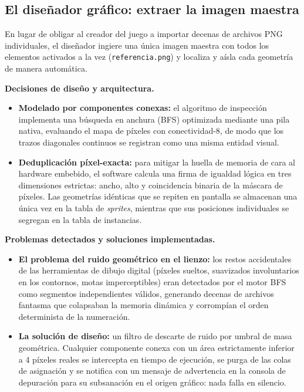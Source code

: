 \subsection{El diseñador gráfico: extraer la imagen maestra}
\label{sec:F1Extraccion}

En lugar de obligar al creador del juego a importar decenas de
archivos PNG individuales, el diseñador ingiere una única imagen
maestra con todos los elementos activados a la vez
(\texttt{referencia.png}) y localiza y aísla cada geometría de manera
automática.

\textbf{Decisiones de diseño y arquitectura.}

\begin{itemize}
	\item \textbf{Modelado por componentes conexas:} el algoritmo de
	inspección implementa una búsqueda en anchura (BFS) optimizada
	mediante una pila nativa, evaluando el mapa de píxeles con
	conectividad-8, de modo que los trazos diagonales continuos se
	registran como una misma entidad visual.
	\item \textbf{Deduplicación píxel-exacta:} para mitigar la huella de
	memoria de cara al hardware embebido, el software calcula una firma
	de igualdad lógica en tres dimensiones estrictas: ancho, alto y
	coincidencia binaria de la máscara de píxeles. Las geometrías
	idénticas que se repiten en pantalla se almacenan una única vez en la
	tabla de \emph{sprites}, mientras que sus posiciones individuales se
	segregan en la tabla de instancias.
\end{itemize}

\textbf{Problemas detectados y soluciones implementadas.}

\begin{itemize}
	\item \textbf{El problema del ruido geométrico en el lienzo:} los
	restos accidentales de las herramientas de dibujo digital (píxeles
	sueltos, suavizados involuntarios en los contornos, motas
	imperceptibles) eran detectados por el motor BFS como segmentos
	independientes válidos, generando decenas de archivos fantasma que
	colapsaban la memoria dinámica y corrompían el orden determinista de
	la numeración.
	\item \textbf{La solución de diseño:} un filtro de descarte de ruido
	por umbral de masa geométrica. Cualquier componente conexa con un área
	estrictamente inferior a 4 píxeles reales se intercepta en tiempo de
	ejecución, se purga de las colas de asignación y se notifica con un
	mensaje de advertencia en la consola de depuración para su subsanación
	en el origen gráfico: nada falla en silencio.
\end{itemize}

